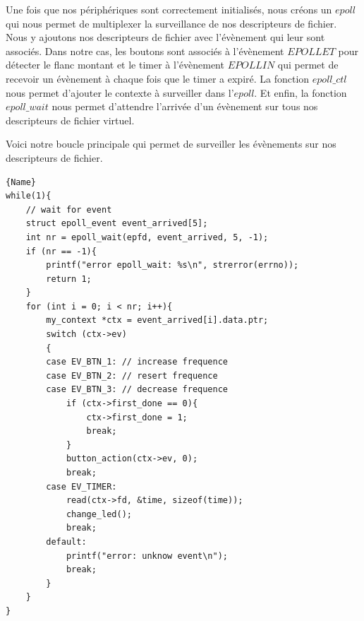 \documentclass[
	a4paper, %
	10pt, %
]{CSUniSchoolLabReport}
\begin{document}
Une fois que nos périphériques sont correctement initialisés, nous créons un $epoll$ qui nous permet de multiplexer la surveillance de nos descripteurs de fichier. Nous y ajoutons nos descripteurs de fichier avec l'évènement qui leur sont associés. Dans notre cas, les boutons sont associés à l'évènement $EPOLLET$ pour détecter le flanc montant et le timer à l'évènement $EPOLLIN$ qui permet de recevoir un évènement à chaque fois que le timer a expiré. La fonction $epoll\_ctl$ nous permet d'ajouter le contexte à surveiller dans l'$epoll$. Et enfin, la fonction $epoll\_wait$ nous permet d'attendre l'arrivée d'un évènement sur tous nos descripteurs de fichier virtuel.

Voici notre boucle principale qui permet de surveiller les évènements sur nos descripteurs de fichier.

\begin{lstlisting}[style=CStyle, caption=Boucle principale, firstnumber=1]{Name}
while(1){
	// wait for event
	struct epoll_event event_arrived[5];
	int nr = epoll_wait(epfd, event_arrived, 5, -1);
	if (nr == -1){
		printf("error epoll_wait: %s\n", strerror(errno));
		return 1;
	}
	for (int i = 0; i < nr; i++){
		my_context *ctx = event_arrived[i].data.ptr;
		switch (ctx->ev)
		{
		case EV_BTN_1: // increase frequence
		case EV_BTN_2: // resert frequence
		case EV_BTN_3: // decrease frequence
			if (ctx->first_done == 0){
				ctx->first_done = 1;
				break;
			}
			button_action(ctx->ev, 0);
			break;
		case EV_TIMER:
			read(ctx->fd, &time, sizeof(time));
			change_led();
			break;
		default:
			printf("error: unknow event\n");
			break;
		}
	}
}
\end{lstlisting}
\end{document}

